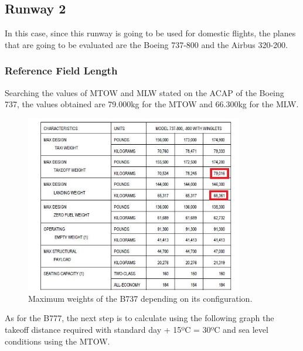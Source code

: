 		\subsection{Runway 2}
		In this case, since this runway is going to be used for domestic flights, the planes that are going to be evaluated are the Boeing 737-800 and the Airbus 320-200.
		\subsubsection{Reference Field Length}
		Searching the values of MTOW and MLW stated on the ACAP of the Boeing 737, the values obtained are 79.000kg for the MTOW and 66.300kg for the MLW.
		
		\begin{figure}[H]
			\centering
			\includegraphics[clip, trim=0cm 0cm 0cm 0cm, width=0.85\textwidth]{./images/B737/B737MTOW}
			\caption{Maximum weights of the B737 depending on its configuration.} %
			\label{} %
		\end{figure}
	
		As for the B777, the next step is to calculate using the following graph the takeoff distance required with standard day + 15ºC = 30ºC and sea level conditions using the MTOW.
		
